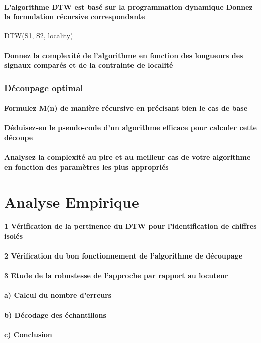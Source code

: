 \documentclass[a4paper,11pt]{article}
\begin{document}
\subsection{L'algorithme DTW est basé sur la programmation dynamique Donnez la formulation récursive correspondante}

DTW(S1, S2, locality)

\subsection{Donnez la complexité de l'algorithme en fonction des longueurs des signaux comparés et de la contrainte de localité}



\section{Découpage optimal}

\subsection{Formulez M(n) de manière récursive en précisant bien le cas de base}

\subsection{Déduisez-en le pseudo-code d'un algorithme efficace pour calculer cette découpe}

\subsection{Analysez la complexité au pire et au meilleur cas de votre algorithme en fonction des paramètres les plus appropriés}

\part{Analyse Empirique}

\subsection*{1 Vérification de la pertinence du DTW pour l'identification de chiffres isolés}

\subsection*{2  Vérification du bon fonctionnement de l'algorithme de découpage}

\subsection*{3  Etude de la robustesse de l'approche par rapport au locuteur}

\subsection*{a) Calcul du nombre d'erreurs}

\subsection*{b) Décodage des échantillons}

\subsection*{c) Conclusion}
\end{document}
